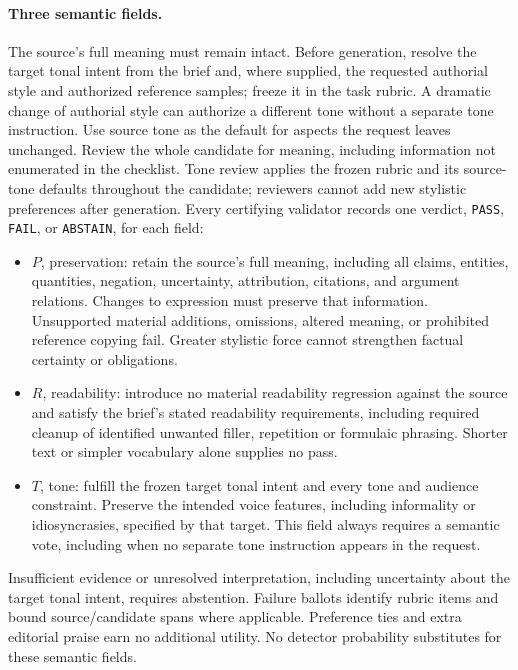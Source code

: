 \paragraph{Three semantic fields.}
The source's full meaning must remain intact. Before generation, resolve
the target tonal intent from the brief and, where supplied, the requested
authorial style and authorized reference samples; freeze it in the task rubric. A dramatic
change of authorial style can authorize a different tone without a
separate tone instruction. Use source tone as the default for aspects the
request leaves unchanged. Review the whole candidate for meaning,
including information not enumerated in the checklist. Tone review
applies the frozen rubric and its source-tone defaults throughout the
candidate; reviewers cannot add new stylistic preferences after
generation. Every certifying validator records one
verdict, \texttt{PASS}, \texttt{FAIL}, or \texttt{ABSTAIN}, for each field:
\begin{itemize}
\tightlist
\item
  \(P\), preservation: retain the source's full meaning, including all
  claims, entities, quantities, negation, uncertainty, attribution,
  citations, and argument relations. Changes to expression must preserve
  that information. Unsupported material additions, omissions, altered
  meaning, or prohibited reference copying fail. Greater stylistic force
  cannot strengthen factual certainty or obligations.
\item
  \(R\), readability: introduce no material readability regression
  against the source and satisfy the brief's stated readability
  requirements, including required cleanup of identified unwanted
  filler, repetition or formulaic phrasing. Shorter text or simpler
  vocabulary alone supplies no pass.
\item
  \(T\), tone: fulfill the frozen target tonal intent and every tone
  and audience constraint. Preserve the intended voice features,
  including informality or idiosyncrasies, specified by that target.
  This field always requires a semantic vote, including when no separate
  tone instruction appears in the request.
\end{itemize}
Insufficient evidence or unresolved interpretation, including uncertainty
about the target tonal intent, requires abstention.
Failure ballots identify rubric items and bound source/candidate spans
where applicable. Preference ties and extra editorial praise earn no
additional utility. No detector probability substitutes for these
semantic fields.

